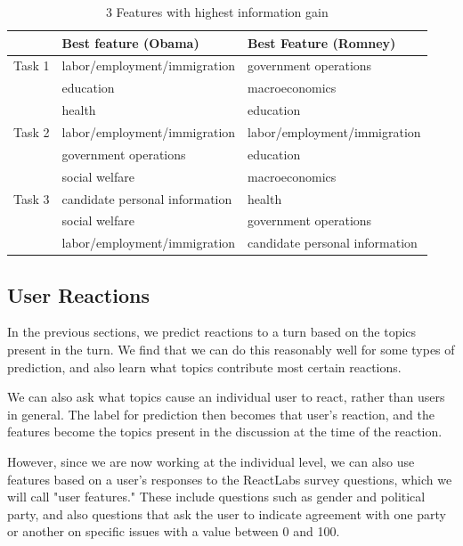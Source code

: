 \documentclass[12pt]{article}
\begin{document}
\begin{table}[H]
\begin{centering}
\begin{tabular}{| l | l | l |}
\hline
  & Best feature (Obama) & Best Feature (Romney) \\
\hline
Task 1 & labor/employment/immigration & government operations \\
	    & education & macroeconomics \\
	    & health & education \\
	    \hline
Task 2 & labor/employment/immigration & labor/employment/immigration \\
	    & government operations & education \\
	    & social welfare & macroeconomics  \\
	    \hline
Task 3 & candidate personal information & health \\
	    & social welfare & government operations \\
	    & labor/employment/immigration & candidate personal information \\
	    \hline
\end{tabular}
\caption{3 Features with highest information gain}
\end{centering}
\end{table}


\subsection{User Reactions}

In the previous sections, we predict reactions to a turn based on the topics present in the turn. We find that we can do this reasonably well for some types of prediction, and also learn what topics contribute most certain reactions.

We can also ask what topics cause an individual user to react, rather than users in general. The label for prediction then becomes that user's reaction, and the features become the topics present in the discussion at the time of the reaction.

However, since we are now working at the individual level, we can also use features based on a user's responses to the ReactLabs survey questions, which we will call "user features." These include questions such as gender and political party, and also questions that ask the user to indicate agreement with one party or another on specific issues with a value between 0 and 100.
\end{document}
